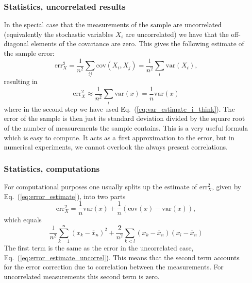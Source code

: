 \documentclass{beamer}
\begin{document}
\begin{frame}
\frametitle{Statistics, uncorrelated results}

\begin{block}{}

In the special case that the measurements of the sample are
uncorrelated (equivalently the stochastic variables $X_i$ are
uncorrelated) we have that the off-diagonal elements of the covariance
are zero. This gives the following estimate of the sample error:
\[
\mathrm{err}_X^2=\frac{1}{n^2}\sum_{ij} \mathrm{cov}(X_i, X_j) =
\frac{1}{n^2} \sum_i \mathrm{var}(X_i),
\]
resulting in
\begin{equation}
\mathrm{err}_X^2\approx \frac{1}{n^2} \sum_i \mathrm{var}(x)= \frac{1}{n}\mathrm{var}(x)
\label{eq:error_estimate_uncorrel}
\end{equation}
where in the second step we have used Eq.~(\ref{eq:var_estimate_i_think}).
The error of the sample is then just its standard deviation divided by
the square root of the number of measurements the sample contains.
This is a very useful formula which is easy to compute. It acts as a
first approximation to the error, but in numerical experiments, we
cannot overlook the always present correlations.
\end{block}
\end{frame}

\begin{frame}
\frametitle{Statistics, computations}

\begin{block}{}
For computational purposes one usually splits up the estimate of
$\mathrm{err}_X^2$, given by Eq.~(\ref{eq:error_estimate}), into two
parts
\[
\mathrm{err}_X^2 = \frac{1}{n}\mathrm{var}(x) + \frac{1}{n}(\mathrm{cov}(x)-\mathrm{var}(x)),
\]
which equals
\begin{equation}
\frac{1}{n^2}\sum_{k=1}^n (x_k - \bar x_n)^2 +\frac{2}{n^2}\sum_{k<l} (x_k - \bar x_n)(x_l - \bar x_n)
\label{eq:error_estimate_split_up}
\end{equation}
The first term is the same as the error in the uncorrelated case,
Eq.~(\ref{eq:error_estimate_uncorrel}). This means that the second
term accounts for the error correction due to correlation between the
measurements. For uncorrelated measurements this second term is zero.
\end{block}
\end{frame}
\end{document}
